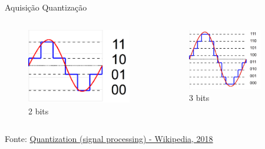 \documentclass[t]{beamer}
\begin{document}
\begin{frame}{Aquisição}
	Quantização
	\begin{columns}
		\begin{column}{0.5\textwidth}
			\begin{figure}
				\includegraphics[width=\textwidth]{quantizacao2bits}
				\caption{2 bits}
			\end{figure}
		\end{column}
		\begin{column}{0.5\textwidth}
			\begin{figure}
				\includegraphics[width=0.8\textwidth]{quantizacao3bits}
				\caption{3 bits}
			\end{figure}
		\end{column}
	\end{columns}
	{\scriptsize Fonte: \href{https://en.wikipedia.org/wiki/Quantization_(signal_processing)}{Quantization (signal processing) - Wikipedia, 2018}}
\end{frame}
\end{document}
